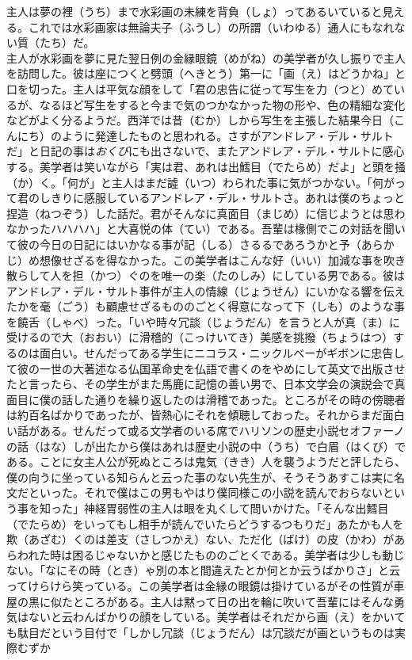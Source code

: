 \documentclass{book}
\begin{document}
主人は夢の裡（うち）まで水彩画の未練を背負（しょ）ってあるいていると見える。これでは水彩画家は無論夫子（ふうし）の所謂（いわゆる）通人にもなれない質（たち）だ。\\
主人が水彩画を夢に見た翌日例の金縁眼鏡（めがね）の美学者が久し振りで主人を訪問した。彼は座につくと劈頭（へきとう）第一に「画（え）はどうかね」と口を切った。主人は平気な顔をして「君の忠告に従って写生を力（つと）めているが、なるほど写生をすると今まで気のつかなかった物の形や、色の精細な変化などがよく分るようだ。西洋では昔（むか）しから写生を主張した結果今日（こんにち）のように発達したものと思われる。さすがアンドレア・デル・サルトだ」と日記の事は\emph{おくび}にも出さないで、またアンドレア・デル・サルトに感心する。美学者は笑いながら「実は君、あれは出鱈目（でたらめ）だよ」と頭を掻（か）く。「何が」と主人はまだ譃（いつ）わられた事に気がつかない。「何がって君のしきりに感服しているアンドレア・デル・サルトさ。あれは僕のちょっと捏造（ねつぞう）した話だ。君がそんなに真面目（まじめ）に信じようとは思わなかったハハハハ」と大喜悦の体（てい）である。吾輩は椽側でこの対話を聞いて彼の今日の日記にはいかなる事が記（しる）さるるであろうかと予（あらかじ）め想像せざるを得なかった。この美学者はこんな好（いい）加減な事を吹き散らして人を担（かつ）ぐのを唯一の楽（たのしみ）にしている男である。彼はアンドレア・デル・サルト事件が主人の情線（じょうせん）にいかなる響を伝えたかを毫（ごう）も顧慮せざるもののごとく得意になって下（しも）のような事を饒舌（しゃべ）った。「いや時々冗談（じょうだん）を言うと人が真（ま）に受けるので大（おおい）に滑稽的（こっけいてき）美感を挑撥（ちょうはつ）するのは面白い。せんだってある学生にニコラス・ニックルベーがギボンに忠告して彼の一世の大著述なる仏国革命史を仏語で書くのをやめにして英文で出版させたと言ったら、その学生がまた馬鹿に記憶の善い男で、日本文学会の演説会で真面目に僕の話した通りを繰り返したのは滑稽であった。ところがその時の傍聴者は約百名ばかりであったが、皆熱心にそれを傾聴しておった。それからまだ面白い話がある。せんだって或る文学者のいる席でハリソンの歴史小説セオファーノの話（はな）しが出たから僕はあれは歴史小説の中（うち）で白眉（はくび）である。ことに女主人公が死ぬところは鬼気（きき）人を襲うようだと評したら、僕の向うに坐っている知らんと云った事のない先生が、そうそうあすこは実に名文だといった。それで僕はこの男もやはり僕同様この小説を読んでおらないという事を知った」神経胃弱性の主人は眼を丸くして問いかけた。「そんな出鱈目（でたらめ）をいってもし相手が読んでいたらどうするつもりだ」あたかも人を欺（あざむ）くのは差支（さしつかえ）ない、ただ化（ばけ）の皮（かわ）があらわれた時は困るじゃないかと感じたもののごとくである。美学者は少しも動じない。「なにその時（とき）ゃ別の本と間違えたとか何とか云うばかりさ」と云ってけらけら笑っている。この美学者は金縁の眼鏡は掛けているがその性質が車屋の黒に似たところがある。主人は黙って日の出を輪に吹いて吾輩にはそんな勇気はないと云わんばかりの顔をしている。美学者はそれだから画（え）をかいても駄目だという目付で「しかし冗談（じょうだん）は冗談だが画というものは実際むずか
\end{document}
